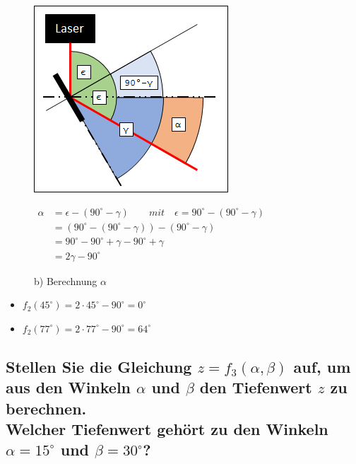 \documentclass[a4paper,10pt,DIV=14]{scrartcl}
\newcommand{\dg}[1]{#1^\circ}
\begin{document}
\begin{figure}[h]
	\begin{minipage}[c]{0.49\textwidth}
		\centering						
		\includegraphics[width=.95\linewidth]{alpha.png}
	\end{minipage}
	\hfill
	\begin{minipage}[c]{0.49\textwidth}
		\centering
		$ \begin{aligned}
			\alpha & = \epsilon - (\dg{90} - \gamma) \qquad \textit{mit} \quad \epsilon = \dg{90} - (\dg{90} - \gamma) \\
			       & = (\dg{90} - (\dg{90} - \gamma)) - (\dg{90} - \gamma) \\
		           & = \dg{90} - \dg{90} + \gamma - \dg{90} + \gamma \\
		           & = 2\gamma - \dg{90}
		\end{aligned} $
	\end{minipage}
	\caption*{b) Berechnung $\alpha$}
\end{figure}

\begin{itemize}[itemsep=0pt]
	\item $f_2(\dg{45}) = 2 \cdot \dg{45} - \dg{90} =  \dg{0}$
	\item $f_2(\dg{77}) = 2 \cdot \dg{77} - \dg{90} =  \dg{64}$
\end{itemize}


\subsection{Stellen Sie die Gleichung $z = f_3(\alpha, \beta)$ auf, um aus den Winkeln $\alpha$ und $\beta$ den Tiefenwert $z$ zu berechnen. \\ Welcher Tiefenwert gehört zu den Winkeln $\alpha = 15^\circ$ und $\beta = 30^\circ$?}
\end{document}
